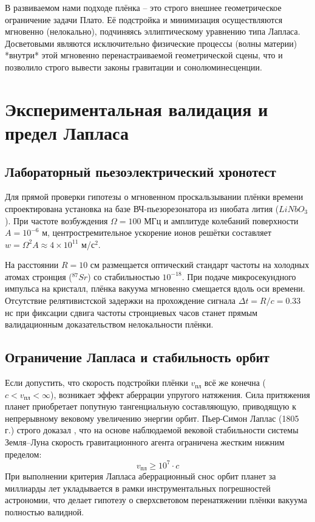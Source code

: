 \documentclass[12pt,a4paper]{article}
\begin{document}
В развиваемом нами подходе плёнка \--- это строго внешнее геометрическое ограничение задачи Плато. Её подстройка и минимизация осуществляются мгновенно (нелокально), подчиняясь эллиптическому уравнению типа Лапласа. Досветовыми являются исключительно физические процессы (волны материи) *внутри* этой мгновенно перенастраиваемой геометрической сцены, что и позволило строго вывести законы гравитации и сонолюминесценции.

\section{Экспериментальная валидация и предел Лапласа}

\subsection{Лабораторный пьезоэлектрический хронотест}  
Для прямой проверки гипотезы о мгновенном проскальзывании плёнки времени спроектирована установка на базе ВЧ-пьезорезонатора из ниобата лития ($LiNbO_3$). При частоте возбуждения $\Omega = 100$ МГц и амплитуде колебаний поверхности $A = 10^{-6}$ м, центростремительное ускорение ионов решётки составляет $w = \Omega^2 A \approx 4 \times 10^{11}$ м/с$^2$.

На расстоянии $R = 10$ см размещается оптический стандарт частоты на холодных атомах стронция ($^{87}Sr$) со стабильностью $10^{-18}$. При подаче микросекундного импульса на кристалл, плёнка вакуума мгновенно смещается вдоль оси времени. Отсутствие релятивистской задержки на прохождение сигнала $\Delta t = R/c = 0.33$ нс при фиксации сдвига частоты стронциевых часов станет прямым валидационным доказательством нелокальности плёнки.

\subsection{Ограничение Лапласа и стабильность орбит}  
Если допустить, что скорость подстройки плёнки $v_{пл}$ всё же конечна ($c < v_{пл} < \infty$), возникает эффект аберрации упругого натяжения. Сила притяжения планет приобретает попутную тангенциальную составляющую, приводящую к непрерывному вековому увеличению энергии орбит. Пьер-Симон Лаплас (1805 г.) строго доказал \cite{Laplace}, что на основе наблюдаемой вековой стабильности системы Земля--Луна скорость гравитационного агента ограничена жестким нижним пределом:  
\begin{equation}  
v_{пл} \ge 10^7 \cdot c  
\end{equation}  
При выполнении критерия Лапласа аберрационный снос орбит планет за миллиарды лет укладывается в рамки инструментальных погрешностей астрономии, что делает гипотезу о сверхсветовом перенатяжении плёнки вакуума полностью валидной.
\end{document}
